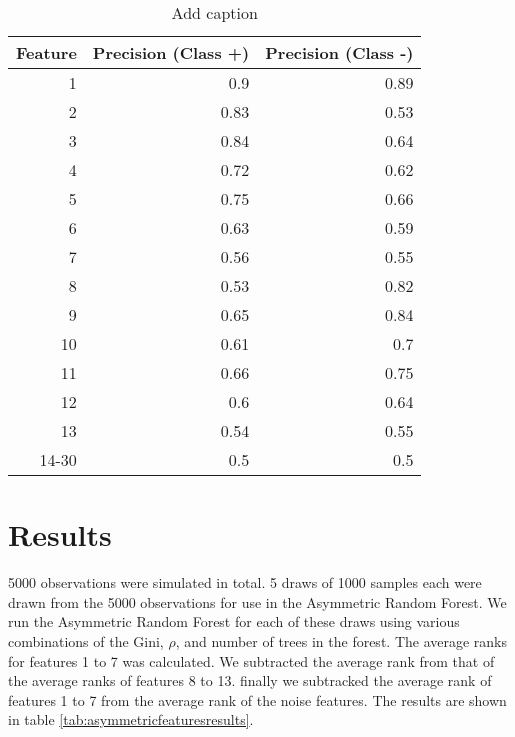 \begin{table}[htbp]
  \centering
  \caption{Add caption}
    \begin{tabular}{rrr}
    \hline
    Feature & Precision (Class +) & Precision (Class -) \bigstrut\\
    \hline
    1     & 0.9   & 0.89 \bigstrut[t]\\
    2     & 0.83  & 0.53 \\
    3     & 0.84  & 0.64 \\
    4     & 0.72  & 0.62 \\
    5     & 0.75  & 0.66 \\
    6     & 0.63  & 0.59 \\
    7     & 0.56  & 0.55 \\
    8     & 0.53  & 0.82 \\
    9     & 0.65  & 0.84 \\
    10    & 0.61  & 0.7 \\
    11    & 0.66  & 0.75 \\
    12    & 0.6   & 0.64 \\
    13    & 0.54  & 0.55 \\
    14-30 & 0.5   & 0.5 \bigstrut[b]\\
    \hline
    \end{tabular}%
  \label{tab:asymmetricfeatures1}%
\end{table}%

\section{Results}
5000 observations were simulated in total. 5 draws of 1000 samples each were drawn from the 5000 observations for use in the Asymmetric Random Forest. We run the Asymmetric Random Forest for each of these draws using various combinations of the Gini, $\rho$, and number of trees in the forest. The average ranks for features 1 to 7 was calculated. We subtracted the average rank from that of the average ranks of features 8 to 13. finally we subtracked the average rank of features 1 to 7 from the average rank of the noise features. The results are shown in table \ref{tab:asymmetricfeaturesresults}.



